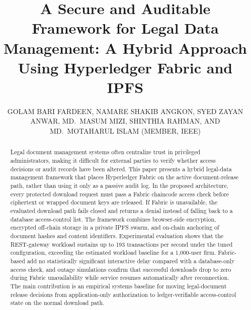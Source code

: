 \documentclass{ieeeaccess}
\begin{document}
\doi{}

\title{A Secure and Auditable Framework for Legal Data Management:
A Hybrid Approach Using Hyperledger Fabric and IPFS}

\author{\uppercase{Golam Bari Fardeen, Namare Shakib Angkon, Syed Zayan
Anwar, Md.\ Masum Mizi, Shinthia Rahman, and Md.\ Motaharul Islam
(Member, IEEE)}}

\address{United International University, United City, Madani Ave,
Dhaka 1212, Bangladesh}







\begin{abstract}
Legal document management systems often centralize trust in privileged administrators, making it difficult for external parties to verify whether access decisions or audit records have been altered. This paper presents a hybrid legal-data management framework that places Hyperledger Fabric on the active document-release path, rather than using it only as a passive audit log. In the proposed architecture, every protected download request must pass a Fabric chaincode access check before ciphertext or wrapped document keys are released. If Fabric is unavailable, the evaluated download path fails closed and returns a denial instead of falling back to a database access-control list. The framework combines browser-side encryption, encrypted off-chain storage in a private IPFS swarm, and on-chain anchoring of document hashes and content identifiers. Experimental evaluation shows that the REST-gateway workload sustains up to 193 transactions per second under the tuned configuration, exceeding the estimated workload baseline for a 1,000-user firm. Fabric-based add no statistically significant interactive delay compared with a database-only access check, and outage simulations confirm that successful downloads drop to zero during Fabric unavailability while service resumes automatically after reconnection. The main contribution is an empirical systems baseline for moving legal-document release decisions from application-only authorization to ledger-verifiable access-control state on the normal download path.
\end{abstract}
\end{document}
